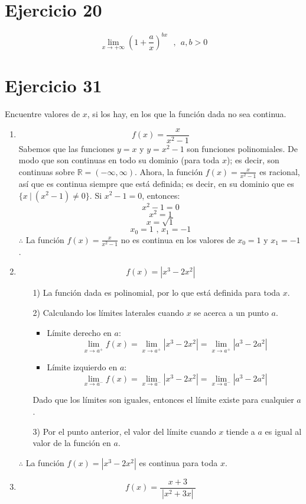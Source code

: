 \documentclass[12pt]{article}
\begin{document}
\section{Ejercicio 20}
\[
\lim_{x \to + \infty} (1+\frac{a}{x})^{bx} ~ ~ ~,~ ~ a,b>0
\]

\section{Ejercicio 31}
Encuentre valores de $x$, si los hay, en los que la función dada no sea continua.
\begin{enumerate}[label=(\alph*)]
\item \[ f(x)=\frac{x}{x^2-1} \]
Sabemos que las funciones $y=x$ y $y=x^2-1$ son funciones polinomiales. De modo que son continuas en todo su dominio (para toda $x$); es decir, son continuas sobre $\mathbb R=(-\infty,\infty)$. Ahora, la función $f(x)=\frac{x}{x^2-1}$ es racional, así que es continua siempre que está definida; es decir, en su dominio que es $\{ x ~|~ (x^2-1) \neq 0 \}$. Si $x^2-1=0$, entonces:
\[
x^2-1=0
\]
\[
x^2=1
\]
\[
x=\sqrt{1}
\]
\[
x_0=1 \text{ , } x_1=-1
\]
$\therefore$ La función $f(x)=\frac{x}{x^2-1}$ no es continua en los valores de $x_0=1 \text{ y } x_1=-1$.

\item \[ f(x)= | x^3-2x^2 | \]
\begin{enumerate}
	\item[1)] La función dada es polinomial, por lo que está definida para toda $x$.
	\item[2)] Calculando los límites laterales cuando $x$ se acerca a un punto $a$.
	\begin{itemize}
		\item Límite derecho en $a$:
		\[ 
		\lim_{x \to a^+}f(x) = \lim_{x \to a^+}| x^3-2x^2 | =\lim_{x \to a^+}| a^3-2a^2 |
		\]
		\item Límite izquierdo en $a$:
		\[ 
		\lim_{x \to a^-}f(x) = \lim_{x \to a^-}| x^3-2x^2 | =\lim_{x \to a^-}| a^3-2a^2 |
		\]
	\end{itemize}
	Dado que los límites son iguales, entonces el límite existe para cualquier $a$.
	\item[3)] Por el punto anterior, el valor del límite cuando $x$ tiende a $a$ es igual al valor de la función en $a$.
\end{enumerate}
$\therefore$ La función $f(x)= |x^3-2x^2 |$ es continua para toda $x$.

\item \[ f(x)=\frac{x+3}{~|x^2+3x|~} \]
\end{enumerate}
\end{document}
